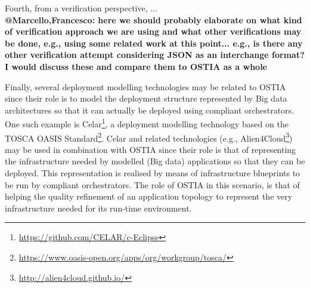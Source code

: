 Fourth, from a verification perspective, ...\\
\textbf{@Marcello,Francesco: here we should probably elaborate on what kind of verification approach we are using and what other verifications may be done, e.g., using some related work at this point... e.g., is there any other verification attempt considering JSON as an interchange format? I would discuss these and compare them to OSTIA as a whole}

Finally, several deployment modelling technologies may be related to OSTIA since their role is to model the deployment structure represented by Big data architectures so that it can actually be deployed using compliant orchestrators. One such example is Celar\footnote{\url{https://github.com/CELAR/c-Eclipse}}, a deployment modelling technology based on the TOSCA OASIS Standard\footnote{\url{https://www.oasis-open.org/apps/org/workgroup/tosca/}}. Celar and related technologies (e.g., Alien4Cloud\footnote{\url{http://alien4cloud.github.io/}}) may be used in combination with OSTIA since their role is that of representing the infrastructure needed by modelled (Big data) applications so that they can be deployed. This representation is realised by means of infrastructure blueprints to be run by compliant orchestrators. The role of OSTIA in this scenario, is that of helping the quality refinement of an application topology to represent the very infrastructure needed for its run-time environment.

